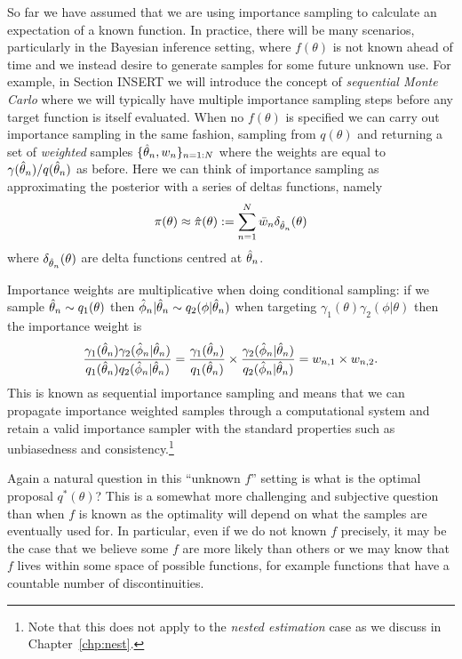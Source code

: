 So far we have assumed that we are using importance sampling to calculate an expectation 
of a known function.  In practice, there will be many scenarios, particularly in the Bayesian inference setting,
where $f(\theta)$ is not known ahead of time and we instead desire to generate samples
for some future unknown use.  For example, in Section INSERT we will introduce the concept
of \emph{sequential Monte Carlo} where we will typically have multiple importance sampling steps
before any target function is itself evaluated.
When no $f(\theta)$ is specified we can carry out importance sampling in the
same fashion, sampling from $q (\theta)$ and returning a set of \emph{weighted} samples
$\{\hat{\theta}_n,w_n\}_{n=1:N}$ where the weights are equal to $\gamma(\hat{\theta}_n) / q(\hat{\theta}_n)$ as before.
Here we can think of importance sampling as approximating the posterior with a series of deltas
functions, namely
\begin{align}
\label{eq:inf:imp-post-est}
\pi (\theta) \approx \hat{\pi}(\theta) := \sum_{n=1}^{N} \bar{w}_n \delta_{\hat{\theta}_n} (\theta)
\end{align}
where $\delta_{\hat{\theta}_n} (\theta)$ are delta functions centred at $\hat{\theta}_n$.

Importance weights are multiplicative when doing conditional
sampling: if we sample $\hat{\theta}_n \sim q_1(\theta)$ then $\hat{\phi}_n | \hat{\theta}_n \sim q_2(\phi | \hat{\theta}_n)$
when targeting $\gamma_1(\theta)\gamma_2(\phi|\theta)$ then the importance weight is 
\begin{align}
\label{eq:inf:prod-imp-weights}
\frac{\gamma_1(\hat{\theta}_n)\gamma_2(\hat{\phi}_n|\hat{\theta}_n)}{q_1(\hat{\theta}_n)q_2(\hat{\phi}_n | \hat{\theta}_n)}
=\frac{\gamma_1(\hat{\theta}_n)}{q_1(\hat{\theta}_n)}
\times\frac{\gamma_2(\hat{\phi}_n|\hat{\theta}_n)} {q_2(\hat{\phi}_n | \hat{\theta}_n)}= w_{n,1} \times w_{n,2}.
\end{align}
This is known as sequential importance sampling and means that we can propagate importance
weighted samples through a computational system and retain a valid importance
sampler with the standard properties such as unbiasedness and consistency.\footnote{Note that
	this does not apply to the \emph{nested estimation} case as we discuss in
	Chapter~\ref{chp:nest}.} 

Again a natural question in this ``unknown $f$'' setting is what is the optimal proposal $q^*(\theta)$?
This is a somewhat more challenging and subjective question than when $f$ is known as the
optimality will depend on what the samples are eventually used for.  In particular, even if we do
not known $f$ precisely, it may be the case that we believe some $f$ are more likely than others or we
may know that $f$ lives within some space of possible functions, for example functions that have
a countable number of discontinuities.  

